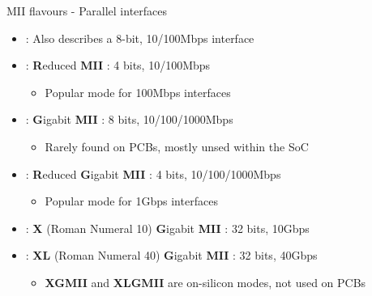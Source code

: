 \begin{frame}{MII flavours - Parallel interfaces}
	\begin{itemize}
		\item {} : Also describes a 8-bit, 10/100Mbps interface
		\item {} : \textbf{R}educed \textbf{MII} : 4 bits, 10/100Mbps
			\begin{itemize}
				\item Popular mode for 100Mbps interfaces
			\end{itemize}
		\item {} : \textbf{G}igabit \textbf{MII} : 8 bits, 10/100/1000Mbps
			\begin{itemize}
				\item Rarely found on PCBs, mostly unsed within the SoC
			\end{itemize}
		\item {} : \textbf{R}educed \textbf{G}igabit \textbf{MII} : 4 bits, 10/100/1000Mbps
			\begin{itemize}
				\item Popular mode for 1Gbps interfaces
			\end{itemize}
		\item {} : \textbf{X} (Roman Numeral 10) \textbf{G}igabit \textbf{MII} : 32 bits, 10Gbps
		\item {} : \textbf{XL} (Roman Numeral 40) \textbf{G}igabit \textbf{MII} : 32 bits, 40Gbps
			\begin{itemize}
				\item \textbf{XGMII} and \textbf{XLGMII} are on-silicon modes, not used on PCBs
			\end{itemize}
	\end{itemize}
\end{frame}

